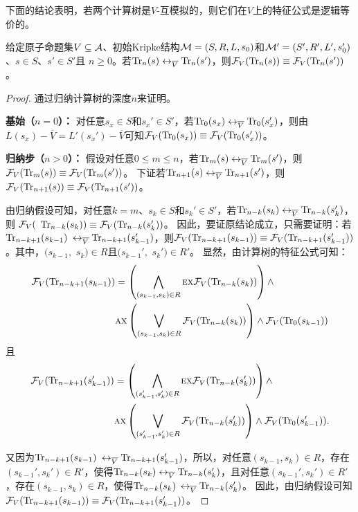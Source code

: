 下面的结论表明，若两个计算树是$V$-互模拟的，则它们在$V$上的特征公式是逻辑等价的。
\begin{lemma}\label{lem:Vb:TrFormula:Equ}
	给定原子命题集$V\subseteq {\cal A}$、初始Kripke结构${\cal M}=(S,R,L,s_0)$和${\cal M}'=(S',R',L',s_0')$、$s\in S$、$s'\in S'$且 $n\ge 0$。若$\textrm{Tr}_n(s) \leftrightarrow_{\overline V} \textrm{Tr}_n(s')$，则${\cal F}_V(\textrm{Tr}_n(s)) \equiv {\cal F}_V(\textrm{Tr}_n(s'))$。
\end{lemma}
\begin{proof}
	通过归纳计算树的深度$n$来证明。
	
	\textbf{基始（$n=0$）：} 对任意$s_x\in S$和$s_x' \in S'$，若$\textrm{Tr}_0(s_x) \leftrightarrow_{\overline V} \textrm{Tr}_0(s_x')$，则由$L(s_x) - \overline V = L'(s_x') - \overline V$可知${\cal F}_V(\textrm{Tr}_0(s_x)) \equiv {\cal F}_V(\textrm{Tr}_0(s_x'))$。
	
	\textbf{归纳步（$n>0$）：} 假设对任意$0\leq m \leq n$，若$\textrm{Tr}_m(s) \leftrightarrow_{\overline V} \textrm{Tr}_m(s')$，则${\cal F}_V(\textrm{Tr}_m(s)) \equiv {\cal F}_V(\textrm{Tr}_m(s'))$。
	下证若$\textrm{Tr}_{n+1}(s) \leftrightarrow_{\overline V} \textrm{Tr}_{n+1}(s')$，则${\cal F}_V(\textrm{Tr}_{n+1}(s)) \equiv {\cal F}_V(\textrm{Tr}_{n+1}(s'))$。
	
	由归纳假设可知，对任意$k=m$、$s_k\in S$和$s_k'\in S'$，若$\textrm{Tr}_{n-k}(s_k) \leftrightarrow_{\overline V} \textrm{Tr}_{n-k}(s_k')$，则 ${\cal F}_V($ $\textrm{Tr}_{n-k}(s_k)) \equiv {\cal F}_V(\textrm{Tr}_{n-k}(s_k'))$。
	因此，要证原结论成立，只需要证明：若$\textrm{Tr}_{n-k+1}(s_{k-1})$ $\leftrightarrow_{\overline V} \textrm{Tr}_{n-k+1}(s_{k-1}')$，则${\cal F}_V(\textrm{Tr}_{n-k+1}(s_{k-1})) \equiv {\cal F}_V(\textrm{Tr}_{n-k+1}(s_{k-1}'))$。其中，$(s_{k-1},$ $s_k)\in R$且$(s_{k-1}',$ $s_k')\in R'$。
	显然，由计算树的特征公式可知：
	\begin{align*}
		{\cal F}_V(\textrm{Tr}_{n-k+1}(s_{k-1})) &  =
		\left(\bigwedge_{(s_{k-1},s_k)\in R}
		\textsc{e} \textsc{x} {\cal F}_V(\textrm{Tr}_{n-k}(s_k))\right)
		\wedge \\
		&\textsc{a} \textsc{x}\left(\bigvee_{(s_{k-1},s_k)\in R}
		{\cal F}_V(\textrm{Tr}_{n-k}(s_k) )\right)
		\wedge {\cal F}_V(\textrm{Tr}_0(s_{k-1}))
	\end{align*}
	且
	\begin{align*}
		{\cal F}_V(\textrm{Tr}_{n-k+1}(s_{k-1}')) &  =
		\left(\bigwedge_{(s_{k-1}',s_k')\in R}
		\textsc{e} \textsc{x} {\cal F}_V(\textrm{Tr}_{n-k}(s_k'))\right)
		\wedge \\
		&\textsc{a} \textsc{x}\left(\bigvee_{(s_{k-1}',s_k')\in R}
		{\cal F}_V(\textrm{Tr}_{n-k}(s_k') )\right)
		\wedge {\cal F}_V(\textrm{Tr}_0(s_{k-1}')).
	\end{align*}
	
	又因为$\textrm{Tr}_{n-k+1}(s_{k-1})$ $\leftrightarrow_{\overline V} \textrm{Tr}_{n-k+1}(s_{k-1}')$，所以，对任意$(s_{k-1}, s_k) \in R$，存在$(s_{k-1}', s_k') \in R'$，使得$\textrm{Tr}_{n-k}(s_k) \leftrightarrow_{\overline V} \textrm{Tr}_{n-k}(s_k')$，且对任意$(s_{k-1}', s_k') \in R'$，存在$(s_{k-1}, s_k) \in R$，使得$\textrm{Tr}_{n-k}(s_k)$ $ \leftrightarrow_{\overline V}\textrm{Tr}_{n-k}(s_k')$。
	因此，由归纳假设可知${\cal F}_V(\textrm{Tr}_{n-k+1}(s_{k-1})) \equiv {\cal F}_V(\textrm{Tr}_{n-k+1}(s_{k-1}'))$。
\end{proof}

